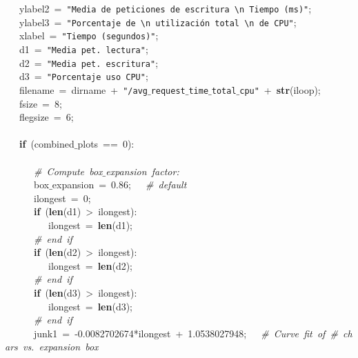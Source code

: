\mbox{}\ \ \ ylabel2\ =\ \texttt{"{}Media\ de\ peticiones\ de\ escritura\ \textbackslash{}n\ Tiempo\ (ms)"{}}; \\
\mbox{}\ \ \ ylabel3\ =\ \texttt{"{}Porcentaje\ de\ \textbackslash{}n\ utilización\ total\ \textbackslash{}n\ de\ CPU"{}}; \\
\mbox{}\ \ \ xlabel\ =\ \texttt{"{}Tiempo\ (segundos)"{}}; \\
\mbox{}\ \ \ d1\ =\ \texttt{"{}Media\ pet.\ lectura"{}}; \\
\mbox{}\ \ \ d2\ =\ \texttt{"{}Media\ pet.\ escritura"{}}; \\
\mbox{}\ \ \ d3\ =\ \texttt{"{}Porcentaje\ uso\ CPU"{}}; \\
\mbox{}\ \ \ filename\ =\ dirname\ +\ \texttt{"{}/avg$\_$request$\_$time$\_$total$\_$cpu"{}}\ +\ \textbf{str}(iloop); \\
\mbox{}\ \ \ fsize\ =\ 8; \\
\mbox{}\ \ \ flegsize\ =\ 6; \\
\mbox{}\ \ \  \\
\mbox{}\ \ \ \textbf{if}\ (combined$\_$plots\ ==\ 0): \\
\mbox{}\ \ \ \ \ \  \\
\mbox{}\ \ \ \ \ \ \textit{\#\ Compute\ box$\_$expansion\ factor:} \\
\mbox{}\ \ \ \ \ \ box$\_$expansion\ =\ 0.86;\ \ \ \textit{\#\ default} \\
\mbox{}\ \ \ \ \ \ ilongest\ =\ 0; \\
\mbox{}\ \ \ \ \ \ \textbf{if}\ (\textbf{len}(d1)\ \textgreater{}\ ilongest): \\
\mbox{}\ \ \ \ \ \ \ \ \ ilongest\ =\ \textbf{len}(d1); \\
\mbox{}\ \ \ \ \ \ \textit{\#\ end\ if} \\
\mbox{}\ \ \ \ \ \ \textbf{if}\ (\textbf{len}(d2)\ \textgreater{}\ ilongest): \\
\mbox{}\ \ \ \ \ \ \ \ \ ilongest\ =\ \textbf{len}(d2); \\
\mbox{}\ \ \ \ \ \ \textit{\#\ end\ if} \\
\mbox{}\ \ \ \ \ \ \textbf{if}\ (\textbf{len}(d3)\ \textgreater{}\ ilongest): \\
\mbox{}\ \ \ \ \ \ \ \ \ ilongest\ =\ \textbf{len}(d3); \\
\mbox{}\ \ \ \ \ \ \textit{\#\ end\ if} \\
\mbox{}\ \ \ \ \ \ junk1\ =\ -0.0082702674*ilongest\ +\ 1.0538027948;\ \ \ \textit{\#\ Curve\ fit\ of\ \#\ chars\ vs.\ expansion\ box} \\
